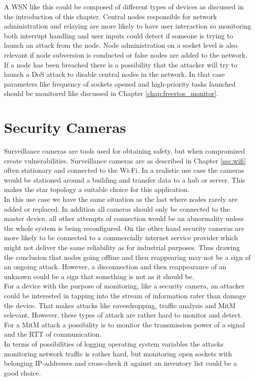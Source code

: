 A WSN like this could be composed of different types of devices as discussed in the introduction of this chapter. Central nodes responsible for network administration and relaying are more likely to have user interaction so monitoring both interrupt handling and user inputs could detect if someone is trying to launch an attack from the node. Node administration on a socket level is also relevant if node subversion is conducted or false nodes are added to the network.\\

If a node has been breached there is a possibility that the attacker will try to launch a DoS attack to disable central nodes in the network. In that case parameters like frequency of sockets opened and high-priority tasks launched should be monitored like discussed in Chapter \ref{chap:freertos_monitor}. 

\section{Security Cameras}

Surveillance cameras are tools used for obtaining safety, but when compromized create vulnerabilities. Surveillance cameras are as described in Chapter \ref{sec:wifi} often stationary and connected to the Wi-Fi. In a realistic use case the cameras would be stationed around a building and transfer data to a hub or server. This makes the star topology a suitable choice for this application.\\

In this use case we have the same situation as the last where nodes rarely are added or replaced. In addition all cameras should only be connected to the master device, all other attempts of connection would be an abnormality unless the whole system is being reconfigured. On the other hand security cameras are more likely to be connected to a commercially internet service provider which might not deliver the same reliability as for industrial purposes. Thus drawing the conclusion that nodes going offline and then reappearing may not be a sign of an ongoing attack. However, a disconnection and then reappearance of an unknown could be a sign that something is not as it should be.\\ 

For a device with the purpose of monitoring, like a security camera, an attacker could be interested in tapping into the stream of information rater than damage the device. That makes attacks like eavesdropping, traffic analysis and MitM relevant. However, these types of attack are rather hard to monitor and detect. For a MitM attack a possibility is to monitor the transmission power of a signal and the RTT of communication. \\

In terms of possibilities of logging operating system variables the attacks monitoring network traffic is rather hard, but monitoring open sockets with belonging IP-addresses and cross-check it against an inventory list could be a good choice.  

